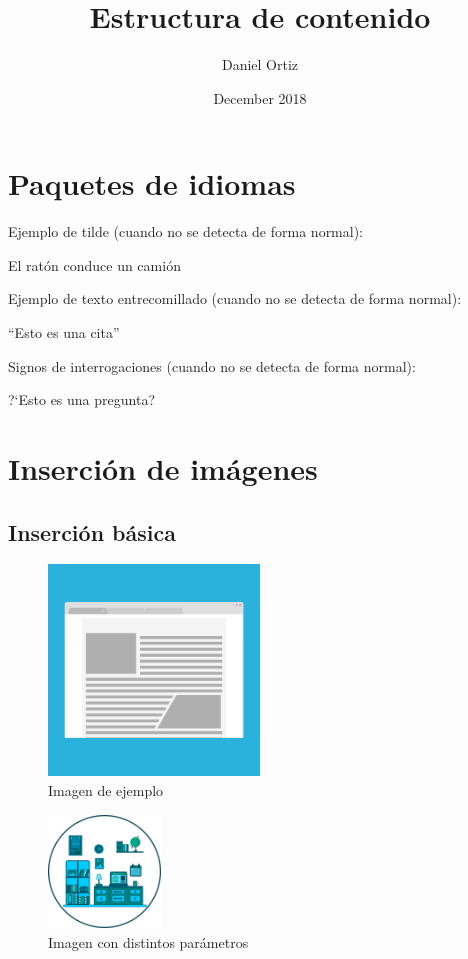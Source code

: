 \documentclass{article}
\title{Estructura de contenido}
\author{Daniel Ortiz}
\date{December 2018}
\begin{document}
\maketitle
\newpage
\section{Paquetes de idiomas}
Ejemplo de tilde (cuando no se detecta de forma normal):
\begin{center}
    El rat\'on conduce un camión
\end{center}
Ejemplo de texto entrecomillado (cuando no se detecta de forma normal):
\begin{center}
     ``Esto es una cita''
\end{center}
Signos de interrogaciones (cuando no se detecta de forma normal):
\begin{center}
     ?`Esto es una pregunta?
\end{center}
\clearpage
\section{Inserción de imágenes}
\subsection{Inserción básica}
\begin{figure}[H] %
\centering \includegraphics[width=0.5\textwidth]{Images/image1.png} \caption{Imagen de ejemplo}
\end{figure}
\begin{figure}[h]
\raggedright \includegraphics[width=3cm]{Images/image2.png} 
\caption{Imagen con distintos parámetros}
\end{figure}
\end{document}
